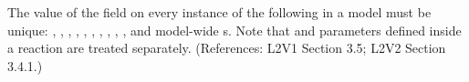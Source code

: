 The value of the  field on every instance of the
following in a model must be unique: \Model, \FunctionDefinition,
\CompartmentType, \Compartment, \SpeciesType, \Species, \Reaction,
\SpeciesReference, \ModifierSpeciesReference, \Event, and
model-wide \Parameter{}s.  Note that \UnitDefinition and
parameters defined inside a reaction are treated separately.
(References: L2V1 Section 3.5; L2V2 Section 3.4.1.)
